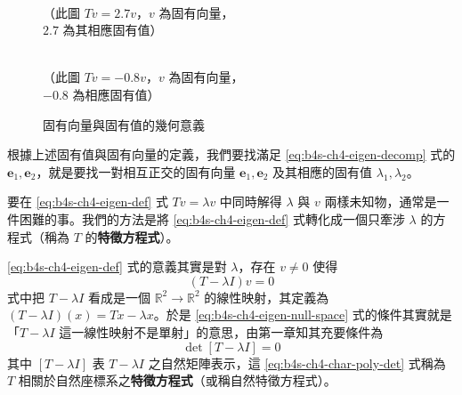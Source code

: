 \begin{figure}[htbp]
\centering
\begin{minipage}{0.48\textwidth}
\centering
{}
\\[4pt]
\small （此圖 $Tv = 2.7v$，$v$ 為固有向量，\\ \small $2.7$ 為其相應固有值）
\end{minipage}
\hfill
\begin{minipage}{0.48\textwidth}
\centering
{}
\\[4pt]
\small （此圖 $Tv = -0.8v$，$v$ 為固有向量，\\ \small $-0.8$ 為相應固有值）
\end{minipage}
\caption{固有向量與固有值的幾何意義}
\label{fig:b4s-ch4-fig2-2}
\end{figure}

根據上述固有值與固有向量的定義，我們要找滿足 \eqref{eq:b4s-ch4-eigen-decomp} 式的 $\mathbf{e}_1, \mathbf{e}_2$，就是要找一對相互正交的固有向量 $\mathbf{e}_1, \mathbf{e}_2$ 及其相應的固有值 $\lambda_1, \lambda_2$。

要在 \eqref{eq:b4s-ch4-eigen-def} 式 $Tv = \lambda v$ 中同時解得 $\lambda$ 與 $v$ 兩樣未知物，通常是一件困難的事。我們的方法是將 \eqref{eq:b4s-ch4-eigen-def} 式轉化成一個只牽涉 $\lambda$ 的方程式（稱為 $T$ 的\textbf{特徵方程式}）。

\eqref{eq:b4s-ch4-eigen-def} 式的意義其實是對 $\lambda$，存在 $v \ne 0$ 使得
\begin{equation}
(T - \lambda I)v = 0
\label{eq:b4s-ch4-eigen-null-space}
\end{equation}
式中把 $T - \lambda I$ 看成是一個 $\mathbb{R}^2 \to \mathbb{R}^2$ 的線性映射，其定義為 $(T - \lambda I)(x) = Tx - \lambda x$。於是 \eqref{eq:b4s-ch4-eigen-null-space} 式的條件其實就是「$T - \lambda I$ 這一線性映射不是單射」的意思，由第一章知其充要條件為
\begin{equation}
\det[T - \lambda I] = 0
\label{eq:b4s-ch4-char-poly-det}
\end{equation}
其中 $[T - \lambda I]$ 表 $T - \lambda I$ 之自然矩陣表示，這 \eqref{eq:b4s-ch4-char-poly-det} 式稱為 $T$ 相關於自然座標系之\textbf{特徵方程式}（或稱自然特徵方程式）。

